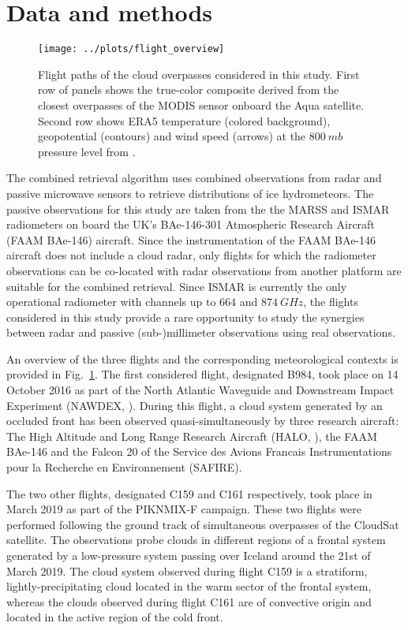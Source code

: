 \documentclass[journal abbreviation, manuscript]{copernicus}
\begin{document}
\section{Data and methods}
\label{sec:methods_and_data}

\begin{figure}[h!]
  \centering \texttt{[image: ../plots/flight\_overview]}
  \caption{Flight paths of the cloud overpasses considered in this study. First
    row of panels shows the true-color composite derived from the closest
    overpasses of the MODIS \citep{modis} sensor onboard the Aqua satellite.
    Second row shows ERA5 temperature (colored background),
    geopotential (contours) and wind speed (arrows) at the $800\ \unit{mb}$
    pressure level from \citep{era5}.}
  \label{fig:flight_overview}
\end{figure}

The combined retrieval algorithm uses combined observations from radar and
passive microwave sensors to retrieve distributions of ice hydrometeors. The
passive observations for this study are taken from the the MARSS
\citep{mcgrath01} and ISMAR \citep{fox17} radiometers on board the UK’s
BAe-146-301 Atmospheric Research Aircraft (FAAM BAe-146) aircraft. Since the
instrumentation of the FAAM BAe-146 aircraft does not include a cloud radar,
only flights for which the radiometer observations can be co-located with radar
observations from another platform are suitable for the combined retrieval.
Since ISMAR is currently the only operational radiometer with channels up to
$664$ and $874\ \unit{GHz}$, the flights considered in this study provide a rare
opportunity to study the synergies between radar and passive (sub-)millimeter
observations using real observations.

An overview of the three flights and the corresponding meteorological contexts
is provided in Fig.~\ref{fig:flight_overview}. The first considered flight,
designated B984, took place on 14 October 2016 as part of the North Atlantic
Waveguide and Downstream Impact Experiment (NAWDEX, \citet{schafler18}). During
this flight, a cloud system generated by an occluded front has been observed
quasi-simultaneously by three research aircraft: The High Altitude and Long
Range Research Aircraft (HALO, \citet{krautstrunk12}), the FAAM BAe-146 and the
Falcon 20 of the Service des Avions Francais Instrumentations pour la Recherche
en Environnement (SAFIRE).

The two other flights, designated C159 and C161 respectively, took place in
March 2019 as part of the PIKNMIX-F campaign. These two flights were performed
following the ground track of simultaneous overpasses of the CloudSat satellite.
The observations probe clouds in different regions of a frontal system generated
by a low-pressure system passing over Iceland around the 21st of March 2019. The
cloud system observed during flight C159 is a stratiform, lightly-precipitating
cloud located in the warm sector of the frontal system, whereas the clouds
observed during flight C161 are of convective origin and located in the active
region of the cold front.
\end{document}
